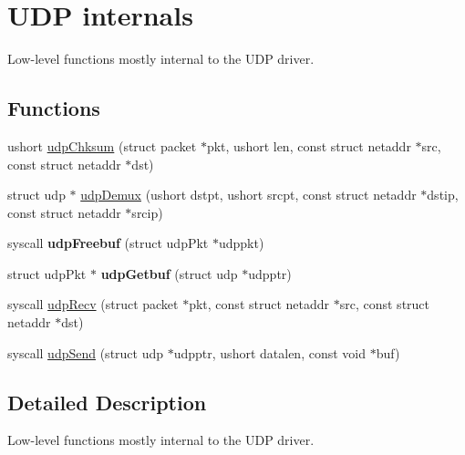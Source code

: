 \hypertarget{group__udpinternal}{\section{U\-D\-P internals}
\label{group__udpinternal}
}


Low-\/level functions mostly internal to the U\-D\-P driver.  


\subsection*{Functions}
\begin{DoxyCompactItemize}
\item 
ushort \hyperlink{group__udpinternal_gabf6402d0f7579e36434eb894d62f4cd9}{udp\-Chksum} (struct packet $\ast$pkt, ushort len, const struct netaddr $\ast$src, const struct netaddr $\ast$dst)
\item 
struct udp $\ast$ \hyperlink{group__udpinternal_gaabaf725b5bfd5ce49a08a8c9905dab1d}{udp\-Demux} (ushort dstpt, ushort srcpt, const struct netaddr $\ast$dstip, const struct netaddr $\ast$srcip)
\item 
\hypertarget{group__udpinternal_ga2a360f56afbbc2f63b2a88efe93d117a}{syscall {\bfseries udp\-Freebuf} (struct udp\-Pkt $\ast$udppkt)}\label{group__udpinternal_ga2a360f56afbbc2f63b2a88efe93d117a}

\item 
\hypertarget{group__udpinternal_ga68d45236b38c1e1cc88f0ea498f14675}{struct udp\-Pkt $\ast$ {\bfseries udp\-Getbuf} (struct udp $\ast$udpptr)}\label{group__udpinternal_ga68d45236b38c1e1cc88f0ea498f14675}

\item 
syscall \hyperlink{group__udpinternal_gaf90c7ded7bff66c36e5d633f009aa7c4}{udp\-Recv} (struct packet $\ast$pkt, const struct netaddr $\ast$src, const struct netaddr $\ast$dst)
\item 
syscall \hyperlink{group__udpinternal_ga22c9e2434d8ea5cae12ca55c82e4d3a3}{udp\-Send} (struct udp $\ast$udpptr, ushort datalen, const void $\ast$buf)
\end{DoxyCompactItemize}


\subsection{Detailed Description}
Low-\/level functions mostly internal to the U\-D\-P driver. 

